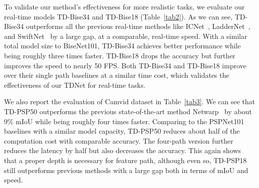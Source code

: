 \documentclass[10pt,twocolumn,letterpaper]{article}
\makeatletter
\renewcommand{\paragraph}{\@startsection{paragraph}{4}{\z@}{2.25ex \@plus 1ex \@minus .2ex}{-1em}{\normalfont\normalsize\bfseries}}
\makeatother
\begin{document}
To validate our method's effectiveness for more realistic tasks, we evaluate our real-time models TD-Bise34 and TD-Bise18 (Table~\ref{tab2}).
As we can see, TD-Bise34 outperforms all the previous real-time methods like ICNet~\cite{zhao2018icnet}, LadderNet~\cite{kreso2017ladder}, and SwiftNet~\cite{orsic2019defense} by a large gap, at a comparable, real-time speed.
With a similar total model size to BiseNet101, TD-Bise34 achieves better performance while being roughly three times faster.
TD-Bise18 drops the accuracy but further improves the speed to nearly 50 FPS. 
Both TD-Bise34 and TD-Bise18 improve over their single path baselines at a similar time cost, which validates the effectiveness of our TDNet for real-time tasks.


\paragraph{Camvid Dataset.}
We also report the evaluation of Camvid dataset in Table~\ref{tab3}. We can see that TD-PSP50 outperforms the previous state-of-the-art method Netwarp~\cite{gadde2017semantic} by about 9\% mIoU while being roughly four times faster. 
Comparing to the PSPNet101 baselines with a similar model capacity, TD-PSP50 reduces about half of the computation cost with comparable accuracy. 
The four-path version further reduces the latency by half but also decreases the accuracy. 
This again shows that a proper depth is necessary for feature path, although even so, TD-PSP18 still outperforms previous methods with a large gap both in terms of mIoU and speed.
\end{document}
